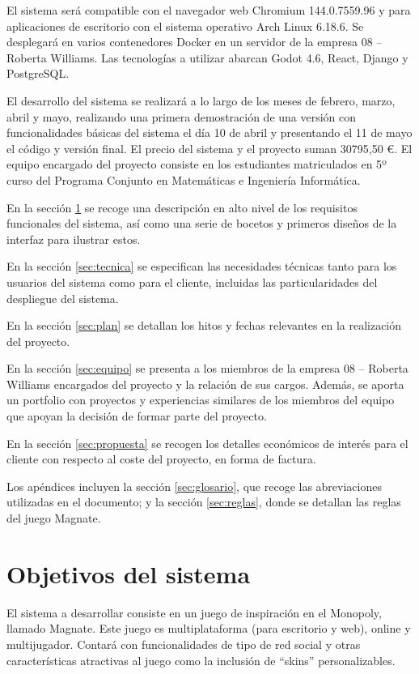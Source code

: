 \documentclass[11pt]{article}
\begin{document}
El sistema será compatible con el navegador web Chromium 144.0.7559.96 y
para aplicaciones de escritorio con el sistema operativo Arch Linux 6.18.6.
Se desplegará en varios 
contenedores Docker en un servidor de la empresa 08 -- Roberta Williams.
Las tecnologías a utilizar abarcan Godot 4.6, React, Django y PostgreSQL.

El desarrollo del sistema se realizará a lo largo de los meses de febrero,
marzo, abril y mayo, realizando una primera demostración de una versión con
funcionalidades básicas del sistema el día 10 de abril y presentando el
11 de mayo el código y versión final. El precio del sistema y el proyecto 
suman 30795,50 €. El equipo encargado del proyecto 
consiste en los estudiantes matriculados en 5º curso del Programa Conjunto en 
Matemáticas e Ingeniería Informática. 

En la sección \ref{sec:objetivos} se recoge una descripción en alto nivel
de los requisitos funcionales del sistema, así como una serie de bocetos
y primeros diseños de la interfaz para ilustrar estos.

En la sección \ref{sec:tecnica} se especifican las necesidades técnicas
tanto para los usuarios del sistema como para el cliente, incluidas las
particularidades del despliegue del sistema.

En la sección \ref{sec:plan} se detallan los hitos y fechas relevantes en
la realización del proyecto.

En la sección \ref{sec:equipo} se presenta a los miembros de la empresa
08 -- Roberta Williams encargados del proyecto y la relación de sus cargos.
Además, se aporta un portfolio con proyectos y experiencias similares de los
miembros del equipo que apoyan la decisión de formar parte del proyecto.

En la sección \ref{sec:propuesta} se recogen los detalles económicos de
interés para el cliente con respecto al coste del proyecto, en forma de
factura.

Los apéndices incluyen 
la sección \ref{sec:glosario}, que recoge las abreviaciones utilizadas
en el documento; y
la sección \ref{sec:reglas}, donde se detallan las reglas del juego Magnate.

\newpage

\section{Objetivos del sistema}
\label{sec:objetivos}
El sistema a desarrollar consiste en un juego de inspiración en el Monopoly, 
llamado Magnate. Este juego es multiplataforma
(para escritorio y web), online y multijugador. Contará con funcionalidades de tipo de
red social y otras características atractivas al juego como la inclusión de ``skins'' 
personalizables.
\end{document}
